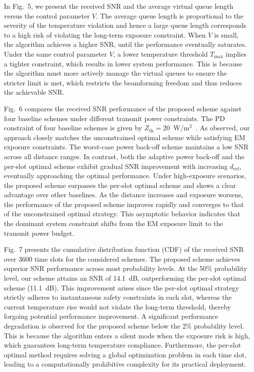 \documentclass[journal]{IEEEtran}
\begin{document}
In Fig.~5, we present the received SNR and the average virtual queue length versus the control parameter $V$. The average queue length is proportional to the severity of the temperature violation and hence a large queue length corresponds to a high risk of violating the long-term exposure constraint. When $V$ is small, the algorithm achieves a higher SNR, until the performance eventually saturates. Under the same control parameter $V$, a lower temperature threshold $T_{\max}$ implies a tighter constraint, which results in lower system performance. This is because the algorithm must more actively manage the virtual queues to ensure the stricter limit is met, which restricts the beamforming freedom and thus reduces the achievable SNR.

Fig.~6 compares the received SNR performance of the proposed scheme against four baseline schemes under different transmit power constraints. The PD constraint of four baseline schemes is given by $Z_{\text{th}} = 20$~W/m$^2$~\cite{ref8}. As observed, our approach closely matches the unconstrained optimal scheme while satisfying EM exposure constraints. The worst-case power back-off scheme maintains a low SNR across all distance ranges. In contrast, both the adaptive power back-off and the per-slot optimal scheme exhibit gradual SNR improvement with increasing $d_{\mathrm{ref}}$, eventually approaching the optimal performance. Under high-exposure scenarios, the proposed scheme surpasses the per-slot optimal scheme and shows a clear advantage over other baselines. As the distance increases and exposure worsens, the performance of the proposed scheme improves rapidly and converges to that of the unconstrained optimal strategy. This asymptotic behavior indicates that the dominant system constraint shifts from the EM exposure limit to the transmit power budget.

Fig.~7 presents the cumulative distribution function (CDF) of the received SNR over 3600 time slots for the considered schemes. The proposed scheme achieves superior SNR performance across most probability levels. At the 50\% probability level, our scheme attains an SNR of 14.1~dB, outperforming the per-slot optimal scheme (11.1~dB). This improvement arises since the per-slot optimal strategy strictly adheres to instantaneous safety constraints in each slot, whereas the current temperature rise would not violate the long-term threshold, thereby forgoing potential performance improvement. A significant performance degradation is observed for the proposed scheme below the 2\% probability level. This is because the algorithm enters a silent mode when the exposure risk is high, which guarantees long-term temperature compliance. Furthermore, the per-slot optimal method requires solving a global optimization problem in each time slot, leading to a computationally prohibitive complexity for its practical deployment.
\end{document}
